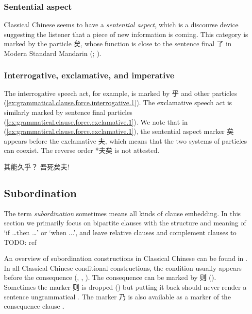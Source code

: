 \documentclass[UTF8, a4paper, oneside, scheme=plain, 12pt]{ctexrep}
\newcommand*{\citechap}[1]{Ch.~{#1}}
\newcommand*{\citepage}[1]{p.~{#1}}
\newcommand*{\term}[1]{\emph{#1}}
\newcommand{\translate}[1]{`#1'}
\begin{document}
\subsubsection{Sentential aspect}

Classical Chinese seems to have a \term{sentential aspect},
which is a discourse device suggesting the listener that a piece of new information is coming.
This category is marked by the particle 矣,
whose function is close to the sentence final 了 in Modern Standard Mandarin
(\citealt{paul2014particles}; \citealt{pan2021sentence}).

\subsubsection{Interrogative, exclamative, and imperative}

The interrogative speech act, for example, is marked by 乎 and other particles
(\ref{ex:grammatical.clause.force.interrogative.1}).
The exclamative speech act is similarly marked by sentence final particles
(\ref{ex:grammatical.clause.force.exclamative.1}).
We note that in (\ref{ex:grammatical.clause.force.exclamative.1}),
the sentential aspect marker 矣 appears before the exclamative 夫,
which means that the two systems of particles can coexist.
The reverse order *夫矣 is not attested.

\begin{exe}
    \ex\label{ex:grammatical.clause.force.interrogative.1} 其能久乎？
    \ex\label{ex:grammatical.clause.force.exclamative.1} 吾死矣夫!
\end{exe}

\subsection{Subordination}\label{sec:grammatical.clause.linking}

The term \term{subordination} sometimes means all kinds of clause embedding.
In this section we primarily focus on bipartite clauses
with the structure and meaning of \translate{if \dots then \dots} or \translate{when ...},
and leave relative clauses and complement clauses to TODO: ref

An overview of subordination constructions in Classical Chinese can be found in \citet[\citechap{3}]{meiguang2018}.
In all Classical Chinese conditional constructions,
the condition usually appears before the consequence
(,
,
).
The consequence can be marked by 则
().
Sometimes the marker 则 is dropped
()
but putting it back should never render a sentence ungrammatical
\citep[\citepage{86}]{meiguang2018}.
The marker 乃 is also available as a marker of the consequence clause
\citep[\citepage{87}]{meiguang2018}.
\end{document}
